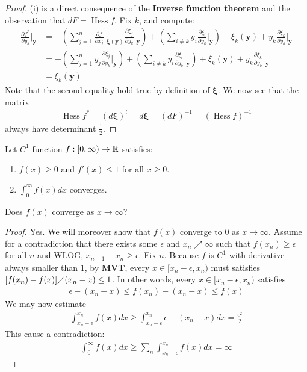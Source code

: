 \documentclass{report}
\begin{document}
\begin{proof}
  (i) is a direct consequence of the \textbf{Inverse function theorem} and the observation that $dF=\operatorname{Hess}f$. Fix $k$, and compute:   
\begin{align*}
\frac{\partial f^*}{\partial y_k}\Bigg|_\textbf{y}&= - \left(\sum_{j=1}^n \frac{\partial f}{\partial x_j}\Bigg|_{\boldsymbol{\xi}(\textbf{y})} \frac{\partial \xi_j}{\partial y_k}\Bigg|_{\textbf{y}} \right)+ \left(\sum_{i \neq k} y_i \frac{\partial \xi_i}{\partial y_k} \Bigg|_\textbf{y} \right) + \xi_k(\textbf{y}) +y_k \frac{\partial \xi_k}{\partial y_k}\Bigg|_{\textbf{y}}\\
&= - \left(\sum_{j=1}^n y_j \frac{\partial \xi_j}{\partial y_k}\Bigg|_{\textbf{y}} \right)+ \left(\sum_{i \neq k} y_i \frac{\partial \xi_i}{\partial y_k} \Bigg|_\textbf{y} \right) + \xi_k(\textbf{y}) +y_k \frac{\partial \xi_k}{\partial y_k}\Bigg|_{\textbf{y}} \\
&= \xi_k (\textbf{y})
\end{align*}
Note that the second equality hold true by definition of $\boldsymbol{\xi}$. We now see  that the matrix 
\begin{align*}
\operatorname{Hess}f^*= (d\boldsymbol{\xi})^t=d\boldsymbol{\xi}=(dF)^{-1}=(\operatorname{Hess}f)^{-1}
\end{align*}
always have determinant $\frac{1}{2}$. 
\end{proof}
\begin{question}{}{}
Let $C^1$ function $f:[0,\infty)\rightarrow \mathbb{R}$ satisfies: 
\begin{enumerate}[label=(\roman*)]
  \item $f(x)\geq 0$ and $f'(x)\leq 1$ for all $x \geq 0$. 
  \item $\int_0^{\infty}f(x)dx$ converges. 
\end{enumerate}
Does $f(x)$ converge as $x \rightarrow \infty$?   
\end{question}
\begin{proof}
  Yes. We will moreover show that $f(x)$ converge to $0$ as  $x\rightarrow \infty$. Assume for a contradiction that there exists some $\epsilon $ and $x_n\nearrow \infty$ such that $f(x_n)\geq  \epsilon $ for all $n$ and WLOG, $x_{n+1}-x_n \geq \epsilon $.  Fix $n$. Because $f$ is $C^1$ with derivative always smaller than $1$, by \textbf{MVT}, every $x \in [x_n-\epsilon ,x_n)$ must satisfies $[f(x_n)-f(x)]\diagup (x_n-x)\leq 1$. In other words, every $x \in [x_n-\epsilon ,x_n)$ satisfies 
\begin{align*}
\epsilon - (x_n-x)\leq f(x_n)-(x_n-x)\leq f(x)  
\end{align*}
We may now estimate 
\begin{align*}
  \int_{x_n-\epsilon }^{x_n} f(x)dx  \geq \int_{x_n-\epsilon }^{x_n} \epsilon - (x_n-x)dx =  \frac{\epsilon ^2}{2}
\end{align*}
This cause a contradiction: 
\begin{align*}
\int_0^{\infty} f(x)dx \geq \sum_n \int_{x_n-\epsilon }^{x_n}f(x)dx =\infty
\end{align*}
\end{proof}
\end{document}
